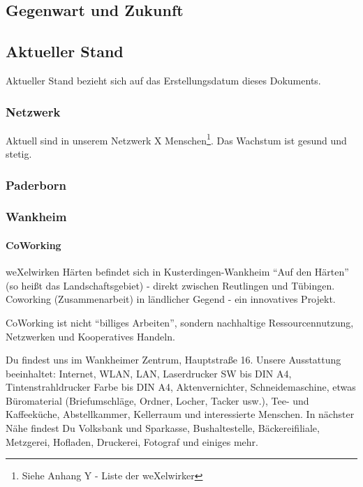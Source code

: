 \begin{appendix}

\chapter{Gegenwart und Zukunft}
  \section{Aktueller Stand}
Aktueller Stand bezieht sich auf das Erstellungsdatum dieses Dokuments.
    \subsection{Netzwerk}
Aktuell sind in unserem Netzwerk X Menschen\footnote{Siehe Anhang Y - Liste der weXelwirker}. Das Wachstum ist gesund und stetig.
    \subsection{Paderborn}
    \subsection{Wankheim}
      \subsubsection{CoWorking}
weXelwirken Härten befindet sich in Kusterdingen-Wankheim "`Auf den Härten"' (so heißt das Landschaftsgebiet) - direkt zwischen Reutlingen und Tübingen.
%
Coworking (Zusammenarbeit) in ländlicher Gegend - ein innovatives Projekt.



CoWorking ist nicht "`billiges Arbeiten"', sondern nachhaltige Ressourcennutzung, Netzwerken und Kooperatives Handeln.




Du findest uns im Wankheimer Zentrum, Hauptstraße 16.
Unsere Ausstattung beeinhaltet: Internet, WLAN, LAN, Laserdrucker SW bis DIN A4, Tintenstrahldrucker Farbe bis DIN A4, Aktenvernichter, Schneidemaschine, etwas Büromaterial (Briefumschläge, Ordner, Locher, Tacker usw.), Tee- und Kaffeeküche, Abstellkammer, Kellerraum und interessierte Menschen.
%
In nächster Nähe findest Du Volksbank und Sparkasse, Bushaltestelle, Bäckereifiliale, Metzgerei, Hofladen, Druckerei, Fotograf und einiges mehr.




\end{appendix}
